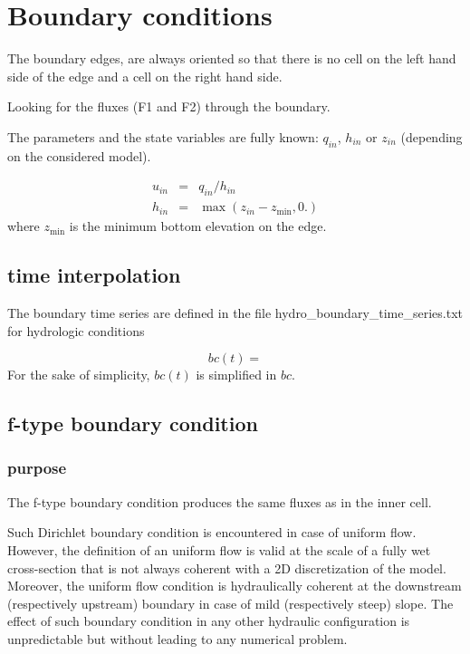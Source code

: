 \chapter{Boundary conditions}

The boundary edges, are always oriented so that there is no cell on the left hand side of the edge and a cell on the right hand side.

Looking for the fluxes (F1 and F2) through the boundary.

The parameters and the state variables are fully known: $q_{in}$, $h_{in}$ or $z_{in}$ (depending on the considered model).

\begin{subequations}
\begin{eqnarray}
u_{in} & = & q_{in} / h_{in} \\
h_{in} & = & \max(z_{in} - z_{\min}, 0.)
\end{eqnarray}
\end{subequations}
where $z_{\min}$ is the minimum bottom elevation on the edge.

\section{time interpolation}
The boundary time series are defined in the file hydro\_boundary\_time\_series.txt for hydrologic conditions 

\begin{equation}
    bc\left(t\right) = 
\end{equation}
For the sake of simplicity, $bc\left(t\right)$ is simplified in $bc$.

\section{f-type boundary condition}
\subsection{purpose}
The f-type boundary condition produces the same fluxes as in the inner cell. 

Such Dirichlet boundary condition is encountered in case of uniform flow. However, the definition of an uniform flow is valid at the scale of a fully wet cross-section that is not always coherent with a 2D discretization of the model. Moreover, the uniform flow condition is hydraulically coherent at the downstream (respectively upstream) boundary in case of mild (respectively steep) slope. The effect of such boundary condition in any other hydraulic configuration is unpredictable but without leading to any numerical problem.

